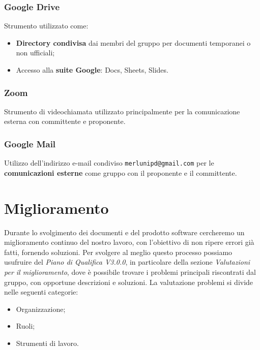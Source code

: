 \subsubsection{Google Drive}
Strumento utilizzato come:
\begin{itemize}
  \item \textbf{Directory condivisa} dai membri del gruppo per documenti temporanei o non ufficiali;
  \item Accesso alla \textbf{suite Google}: Docs, Sheets, Slides.
\end{itemize}

\subsubsection{Zoom}
Strumento di videochiamata utilizzato principalmente per la comunicazione esterna con committente e proponente.

\subsubsection{Google Mail}
Utilizzo dell'indirizzo e-mail condiviso \texttt{merlunipd@gmail.com} per le \textbf{comunicazioni esterne} come gruppo con il proponente e il committente.

\section{Miglioramento}
Durante lo svolgimento dei documenti e del prodotto software cercheremo un miglioramento continuo del nostro lavoro, con l'obiettivo di non ripere errori già fatti, fornendo soluzioni. Per svolgere al meglio questo processo possiamo usufruire del \textit{Piano di Qualifica V3.0.0}, in particolare della sezione \textit{Valutazioni per il miglioramento}, dove è possibile trovare i problemi principali riscontrati dal gruppo, con opportune descrizioni e soluzioni. La valutazione problemi si divide nelle seguenti categorie:
\begin{itemize}
  \item Organizzazione;
  \item Ruoli;
  \item Strumenti di lavoro.
\end{itemize}

